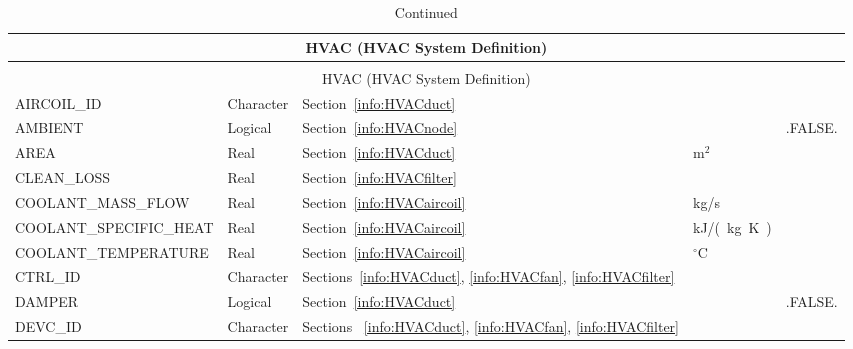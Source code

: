 \documentclass[11pt]{book}
\begin{document}
\begin{longtable}{@{\extracolsep{\fill}}|l|l|l|l|l|}
\caption[HVAC parameters ({\ct HVAC} namelist group)]{For more information see Section~\ref{info:HVAC}.}
\label{tbl:HVAC} \\
\hline
\multicolumn{5}{|c|}{{\ct HVAC} (HVAC System Definition)} \\
\hline \hline
\endfirsthead
\caption[]{Continued} \\
\hline
\multicolumn{5}{|c|}{{\ct HVAC} (HVAC System Definition)} \\
\hline \hline
\endhead
{\ct AIRCOIL\_ID}               & Character         & Section~\ref{info:HVACduct}                                                   &               &                \\ \hline
{\ct AMBIENT}                   & Logical           & Section~\ref{info:HVACnode}                                                   &               & {\ct .FALSE.}  \\ \hline
{\ct AREA}                      & Real              & Section~\ref{info:HVACduct}                                                   & m$^2$         &                \\ \hline
{\ct CLEAN\_LOSS}               & Real              & Section~\ref{info:HVACfilter}                                                 &               &                \\ \hline
{\ct COOLANT\_MASS\_FLOW}       & Real              & Section~\ref{info:HVACaircoil}                                                & kg/s          &                \\ \hline
{\ct COOLANT\_SPECIFIC\_HEAT}   & Real              & Section~\ref{info:HVACaircoil}                                                & \si{kJ/(kg.K)} &                \\ \hline
{\ct COOLANT\_TEMPERATURE}      & Real              & Section~\ref{info:HVACaircoil}                                                & $^\circ$C     &                \\ \hline
{\ct CTRL\_ID}                  & Character         & Sections~\ref{info:HVACduct}, \ref{info:HVACfan}, \ref{info:HVACfilter}       &               &                \\ \hline
{\ct DAMPER}                    & Logical           & Section~\ref{info:HVACduct}                                                   &               & {\ct .FALSE.}  \\ \hline
{\ct DEVC\_ID}                  & Character         & Sections ~\ref{info:HVACduct}, \ref{info:HVACfan}, \ref{info:HVACfilter}      &               &                \\ \hline

\end{longtable}
\end{document}
